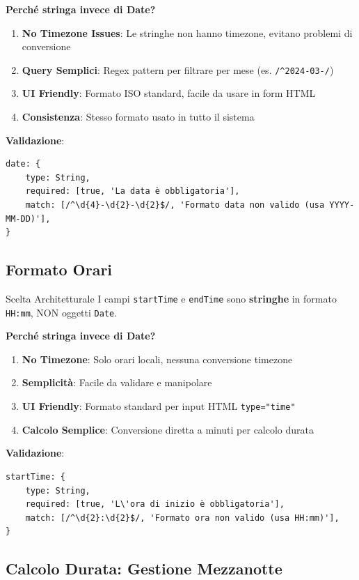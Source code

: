 \documentclass[11pt,a4paper]{article}
\begin{document}
\textbf{Perché stringa invece di Date?}
\begin{enumerate}
    \item \textbf{No Timezone Issues}: Le stringhe non hanno timezone, evitano problemi di conversione
    \item \textbf{Query Semplici}: Regex pattern per filtrare per mese (es. \texttt{/^2024-03-/})
    \item \textbf{UI Friendly}: Formato ISO standard, facile da usare in form HTML
    \item \textbf{Consistenza}: Stesso formato usato in tutto il sistema
\end{enumerate}

\textbf{Validazione}:
\begin{lstlisting}
date: { 
    type: String, 
    required: [true, 'La data è obbligatoria'],
    match: [/^\d{4}-\d{2}-\d{2}$/, 'Formato data non valido (usa YYYY-MM-DD)'],
}
\end{lstlisting}

\subsection{Formato Orari}

\begin{importantbox}{Scelta Architetturale}
I campi \texttt{startTime} e \texttt{endTime} sono \textbf{stringhe} in formato \texttt{HH:mm}, NON oggetti \texttt{Date}.
\end{importantbox}

\textbf{Perché stringa invece di Date?}
\begin{enumerate}
    \item \textbf{No Timezone}: Solo orari locali, nessuna conversione timezone
    \item \textbf{Semplicità}: Facile da validare e manipolare
    \item \textbf{UI Friendly}: Formato standard per input HTML \texttt{type="time"}
    \item \textbf{Calcolo Semplice}: Conversione diretta a minuti per calcolo durata
\end{enumerate}

\textbf{Validazione}:
\begin{lstlisting}
startTime: { 
    type: String, 
    required: [true, 'L\'ora di inizio è obbligatoria'],
    match: [/^\d{2}:\d{2}$/, 'Formato ora non valido (usa HH:mm)'],
}
\end{lstlisting}

\subsection{Calcolo Durata: Gestione Mezzanotte}
\end{document}
